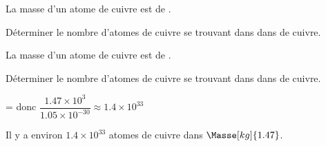 \begin{exercice*}
    La masse d’un atome de cuivre est de .

    Déterminer le nombre d'atomes de cuivre se trouvant dans dans  de cuivre.
\end{exercice*}
\begin{corrige}
    La masse d’un atome de cuivre est de .

    Déterminer le nombre d'atomes de cuivre se trouvant dans dans  de cuivre.

    {\red {} =  donc $\dfrac{\num{1.47}\times 10^3}{\num{1.05}\times 10^{-30}}\approx \num{1.4}\times 10^{33}$
    
    Il y a environ $\num{1.4}\times 10^{33}$ atomes de cuivre dans $\Masse[kg]{1.47}$.}
\end{corrige}

